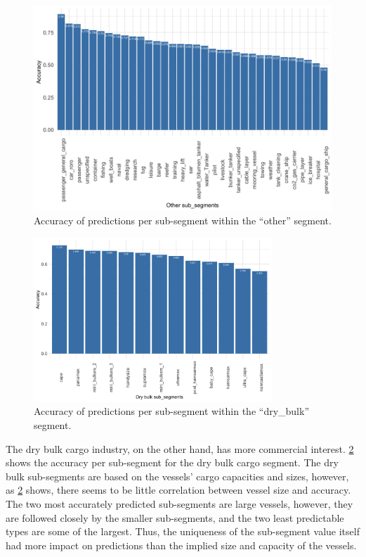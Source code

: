 \begin{figure}[htbp]
    \centering
    \includegraphics[width=1.0\textwidth]{figures/results/seg_other_acc}
    \caption{Accuracy of predictions per sub-segment within the ``other'' segment.}
    \label{fig:other_accuracy}
\end{figure}
\begin{figure}[htbp]
    \centering
    \includegraphics[width=0.8\textwidth]{figures/results/seg_dry_bulk_acc}
    \caption{Accuracy of predictions per sub-segment within the ``dry\_bulk'' segment.}
    \label{fig:dry_bulk_accuracy}
\end{figure}


The dry bulk cargo industry, on the other hand, has more commercial interest. \cref{fig:dry_bulk_accuracy} shows the accuracy per sub-segment for the dry bulk cargo segment. The dry bulk sub-segments are based on the vessels' cargo capacities and sizes, however, as \cref{fig:dry_bulk_accuracy} shows, there seems to be little correlation between vessel size and accuracy. The two most accurately predicted sub-segments are large vessels, however, they are followed closely by the smaller sub-segments, and the two least predictable types are some of the largest. Thus, the uniqueness of the sub-segment value itself had more impact on predictions than the implied size and capacity of the vessels.

